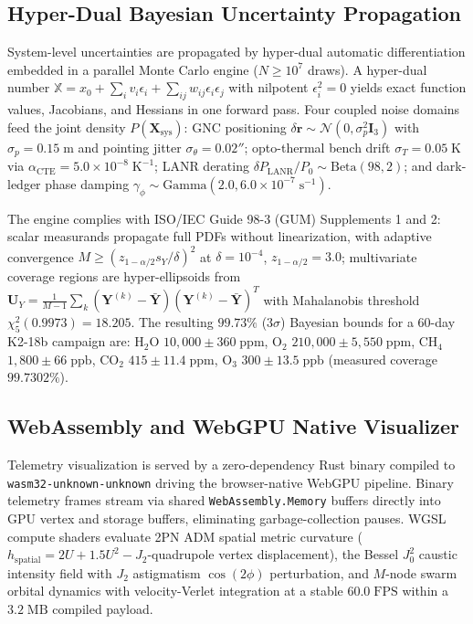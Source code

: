 \documentclass[10pt,twocolumn]{IEEEtran}
\begin{document}
\subsection{Hyper-Dual Bayesian Uncertainty Propagation}
\label{sec:uncertainty_uq}

System-level uncertainties are propagated by hyper-dual automatic
differentiation embedded in a parallel Monte Carlo engine
($N\geq10^{7}$ draws).  A hyper-dual number
$\mathbb{X}=x_0+\sum_i v_i\epsilon_i+\sum_{ij}w_{ij}\epsilon_i\epsilon_j$
with nilpotent $\epsilon_i^{2}=0$ yields exact function values,
Jacobians, and Hessians in one forward pass.  Four coupled noise domains
feed the joint density $P(\mathbf{X}_{\mathrm{sys}})$: GNC positioning
$\delta\mathbf{r}\sim\mathcal{N}(0,\sigma_p^{2}\mathbf{I}_3)$ with
$\sigma_p=0.15\;\mathrm{m}$ and pointing jitter
$\sigma_\theta=0.02''$; opto-thermal bench drift $\sigma_T=0.05\;\mathrm{K}$
via $\alpha_{\mathrm{CTE}}=5.0\times10^{-8}\;\mathrm{K^{-1}}$; LANR
derating $\delta P_{\mathrm{LANR}}/P_0\sim\mathrm{Beta}(98,2)$; and
dark-ledger phase damping
$\gamma_\phi\sim\mathrm{Gamma}(2.0,6.0\times10^{-7}\;\mathrm{s^{-1}})$.

The engine complies with ISO/IEC Guide 98-3 (GUM) Supplements 1 and 2:
scalar measurands propagate full PDFs without linearization, with
adaptive convergence $M\geq(z_{1-\alpha/2}s_Y/\delta)^{2}$ at
$\delta=10^{-4}$, $z_{1-\alpha/2}=3.0$; multivariate coverage regions
are hyper-ellipsoids from
$\mathbf{U}_Y=\frac{1}{M-1}\sum_k(\mathbf{Y}^{(k)}-\bar{\mathbf{Y}})
(\mathbf{Y}^{(k)}-\bar{\mathbf{Y}})^{T}$
with Mahalanobis threshold $\chi_5^{2}(0.9973)=18.205$.  The resulting
$99.73\%$ ($3\sigma$) Bayesian bounds for a 60-day K2-18b campaign are:
$\mathrm{H_2O}$ $10{,}000\pm360\;\mathrm{ppm}$,
$\mathrm{O_2}$ $210{,}000\pm5{,}550\;\mathrm{ppm}$,
$\mathrm{CH_4}$ $1{,}800\pm66\;\mathrm{ppb}$,
$\mathrm{CO_2}$ $415\pm11.4\;\mathrm{ppm}$,
$\mathrm{O_3}$ $300\pm13.5\;\mathrm{ppb}$ (measured coverage
$99.7302\%$).

\subsection{WebAssembly and WebGPU Native Visualizer}
\label{sec:webgpu_vis}

Telemetry visualization is served by a zero-dependency Rust binary
compiled to \texttt{wasm32-unknown-unknown} driving the browser-native
WebGPU pipeline.  Binary telemetry frames stream via shared
\texttt{WebAssembly.Memory} buffers directly into GPU vertex and storage
buffers, eliminating garbage-collection pauses.  WGSL compute shaders
evaluate 2PN ADM spatial metric curvature
($h_{\mathrm{spatial}}=2U+1.5U^{2}-J_2$-quadrupole vertex displacement),
the Bessel $J_0^{2}$ caustic intensity field with $J_2$ astigmatism
$\cos(2\phi)$ perturbation, and $M$-node swarm orbital dynamics with
velocity-Verlet integration at a stable $60.0\;\mathrm{FPS}$ within a
$3.2\;\mathrm{MB}$ compiled payload.
\end{document}
